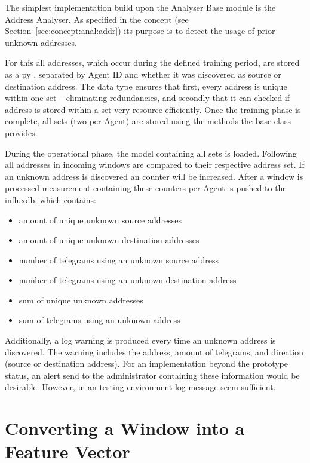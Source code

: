 The simplest implementation build upon the Analyser Base module is the Address Analyser.
As specified in the concept (see Section~\ref{sec:concept:anal:addr}) its purpose is to detect the usage of prior unknown addresses.

For this all addresses, which occur during the defined training period, are stored as a \gls{py} , separated by Agent ID and whether it was discovered as source or destination address. 
The  data type ensures that first, every address is unique within one set -- eliminating redundancies, and secondly that it can checked if address is stored within a set very resource efficiently.
Once the training phase is complete, all sets (two per Agent) are stored using the methods the base class provides.

During the operational phase, the model containing all sets is loaded. Following all addresses in incoming windows are compared to their respective address set.
If an unknown address is discovered an counter will be increased. After a window is processed measurement containing these counters per Agent is pushed to the \gls{influxdb}, which contains:

\begin{itemize}
	\item amount of unique unknown source addresses
	\item amount of unique unknown destination addresses
	\item number of telegrams using an unknown source address
	\item number of telegrams using an unknown destination address
	\item sum of unique unknown addresses
	\item sum of telegrams using an unknown address
\end{itemize}

Additionally, a log warning is produced every time an unknown address is discovered. The warning includes the address, amount of telegrams, and direction (source or destination address).
For an implementation beyond the prototype status, an alert send to the administrator containing these information would be desirable.
However, in an testing environment log message seem sufficient.

\section{Converting a Window into a Feature Vector}
\label{sec:impl:vectoriser}

